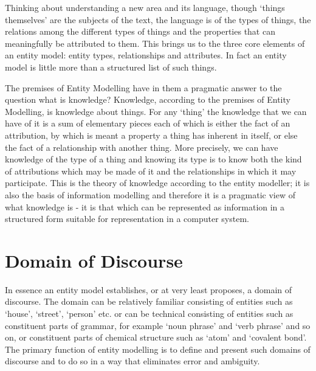\noindent Thinking about understanding a new area and its language, though `things themselves' 
are the subjects of the text, the language is of the types of things, the relations among 
the different types of things and the properties that can meaningfully be attributed to them.
This brings us to the 
three core elements of an entity model: entity types, relationships and attributes. In fact an entity 
model is little more than a structured list of such things.\\


\begin{erexample}
\begin{center}

\end{center}
\end{erexample}

\noindent The premises of Entity Modelling have in them a pragmatic answer to the question what is knowledge? 
Knowledge, according to the premises of Entity Modelling, is knowledge about things. For any `thing' the knowledge that we can have of it is a sum of elementary pieces each of which is either the fact of an attribution, by which is meant a property a thing has inherent in itself, or else the fact of a relationship with another thing.  More precisely, we can have knowledge of the type of a thing and knowing its type is to know both the kind of attributions which may be made of it and the relationships in which it may participate. This is the theory of knowledge according to the entity modeller;  it is also the basis of information modelling and therefore it is a pragmatic view of what knowledge is - it is that which can be represented as information in a structured form suitable for representation in a computer system. \\

\section{Domain of Discourse}
\noindent In essence an entity model establishes, or at very least proposes, a domain of discourse. The domain can be relatively familiar consisting of entities such as `house', `street', `person' etc. or can be technical consisting of entities such as constituent parts of grammar, for example `noun phrase' and  `verb phrase' and so on, or constituent parts of chemical structure such as `atom' and `covalent bond'. The primary function of entity modelling is to define and present such domains of discourse and to do so in a way that eliminates error and ambiguity. \\

